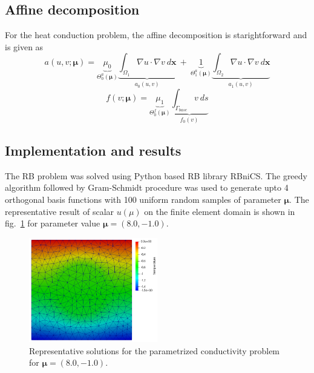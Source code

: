 \documentclass[11pt, oneside]{article}
\begin{document}
\subsection{Affine decomposition}
For the heat conduction problem, the affine decomposition is starightforward and is given as
\begin{equation}
  a(u,v;\boldsymbol{\mu})=\underbrace{\mu_0}_{\Theta^{a}_0(\boldsymbol{\mu})}\underbrace{\int_{\Omega_1}\nabla u \cdot \nabla v \ d\boldsymbol{x}}_{a_0(u,v)} \ + \  \underbrace{1}_{\Theta^{a}_1(\boldsymbol{\mu})}\underbrace{\int_{\Omega_2}\nabla u \cdot \nabla v \ d\boldsymbol{x}}_{a_1(u,v)}
\end{equation}
\begin{equation}
  f(v; \boldsymbol{\mu}) = \underbrace{\mu_1}_{\Theta^{f}_0(\boldsymbol{\mu})} \underbrace{\int_{\Gamma_{base}}v \ ds}_{f_0(v)}
\end{equation}

\subsection{Implementation and results}
The RB problem was solved using Python based RB library RBniCS. The greedy algorithm followed by Gram-Schmidt procedure was used to generate upto 4 orthogonal basis functions with 100 uniform random samples of parameter $\mathbf{\mu}$. The representative result of scalar $u(\mu)$ on the finite element domain is shown in fig.~\ref{fig:2} for parameter value $\mathbf{\mu} = (8.0,-1.0)$.
    \begin{figure}
        \centering
        \includegraphics[width=0.5\textwidth]{figures/Thermal_Block.png}
        \caption{Representative solutions for the parametrized conductivity problem for $\mathbf{\mu} = (8.0,-1.0)$.}
        \label{fig:2}
    \end{figure}
\end{document}
